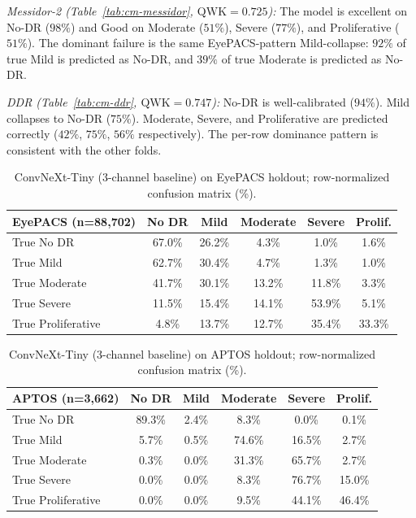 \documentclass[11pt]{article}
\begin{document}
\textit{Messidor-2 (Table~\ref{tab:cm-messidor}, $\mathrm{QWK} = 0.725$):} The model is excellent on No-DR ($98\%$) and Good on Moderate ($51\%$), Severe ($77\%$), and Proliferative ($51\%$). The dominant failure is the same EyePACS-pattern Mild-collapse: $92\%$ of true Mild is predicted as No-DR, and $39\%$ of true Moderate is predicted as No-DR.

\textit{DDR (Table~\ref{tab:cm-ddr}, $\mathrm{QWK} = 0.747$):} No-DR is well-calibrated ($94\%$). Mild collapses to No-DR ($75\%$). Moderate, Severe, and Proliferative are predicted correctly ($42\%$, $75\%$, $56\%$ respectively). The per-row dominance pattern is consistent with the other folds.

\begin{table}[ht]
\centering
\small
\begin{tabular}{lccccc}
\toprule
EyePACS (n=88{,}702)        & No DR    & Mild     & Moderate & Severe   & Prolif. \\
\midrule
True No DR                  & 67.0\%   & 26.2\%   & 4.3\%    & 1.0\%    & 1.6\%   \\
True Mild                   & 62.7\%   & 30.4\%   & 4.7\%    & 1.3\%    & 1.0\%   \\
True Moderate               & 41.7\%   & 30.1\%   & 13.2\%   & 11.8\%   & 3.3\%   \\
True Severe                 & 11.5\%   & 15.4\%   & 14.1\%   & 53.9\%   & 5.1\%   \\
True Proliferative          & 4.8\%    & 13.7\%   & 12.7\%   & 35.4\%   & 33.3\%  \\
\bottomrule
\end{tabular}
\caption{ConvNeXt-Tiny (3-channel baseline) on EyePACS holdout; row-normalized confusion matrix (\%).}
\label{tab:cm-eyepacs}
\end{table}

\begin{table}[ht]
\centering
\small
\begin{tabular}{lccccc}
\toprule
APTOS (n=3{,}662)           & No DR    & Mild     & Moderate & Severe   & Prolif. \\
\midrule
True No DR                  & 89.3\%   & 2.4\%    & 8.3\%    & 0.0\%    & 0.1\%   \\
True Mild                   & 5.7\%    & 0.5\%    & 74.6\%   & 16.5\%   & 2.7\%   \\
True Moderate               & 0.3\%    & 0.0\%    & 31.3\%   & 65.7\%   & 2.7\%   \\
True Severe                 & 0.0\%    & 0.0\%    & 8.3\%    & 76.7\%   & 15.0\%  \\
True Proliferative          & 0.0\%    & 0.0\%    & 9.5\%    & 44.1\%   & 46.4\%  \\
\bottomrule
\end{tabular}
\caption{ConvNeXt-Tiny (3-channel baseline) on APTOS holdout; row-normalized confusion matrix (\%).}
\label{tab:cm-aptos}
\end{table}
\end{document}
